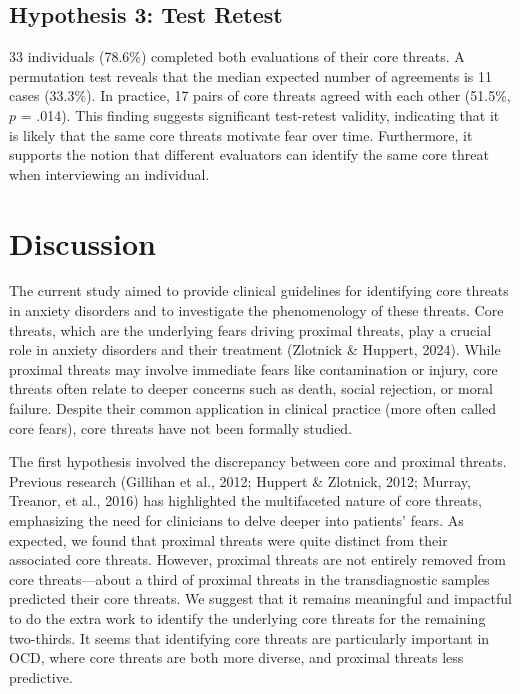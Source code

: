 \documentclass[
  man,floatsintext]{apa7}
\begin{document}
\subsection{Hypothesis 3: Test Retest}\label{hypothesis-3-test-retest}

33 individuals (78.6\%) completed both evaluations of their core threats.
A permutation test reveals that the median expected number of agreements is 11 cases (33.3\%).
In practice, 17 pairs of core threats agreed with each other (51.5\%, \(p\) = .014).
This finding suggests significant test-retest validity, indicating that it is likely that the same core threats motivate fear over time.
Furthermore, it supports the notion that different evaluators can identify the same core threat when interviewing an individual.

\section{Discussion}\label{discussion}

The current study aimed to provide clinical guidelines for identifying core threats in anxiety disorders and to investigate the phenomenology of these threats.
Core threats, which are the underlying fears driving proximal threats, play a crucial role in anxiety disorders and their treatment (Zlotnick \& Huppert, 2024).
While proximal threats may involve immediate fears like contamination or injury, core threats often relate to deeper concerns such as death, social rejection, or moral failure.
Despite their common application in clinical practice (more often called core fears), core threats have not been formally studied.

The first hypothesis involved the discrepancy between core and proximal threats.
Previous research (Gillihan et al., 2012; Huppert \& Zlotnick, 2012; Murray, Treanor, et al., 2016) has highlighted the multifaceted nature of core threats, emphasizing the need for clinicians to delve deeper into patients' fears.
As expected, we found that proximal threats were quite distinct from their associated core threats.
However, proximal threats are not entirely removed from core threats---about a third of proximal threats in the transdiagnostic samples predicted their core threats.
We suggest that it remains meaningful and impactful to do the extra work to identify the underlying core threats for the remaining two-thirds.
It seems that identifying core threats are particularly important in OCD, where core threats are both more diverse, and proximal threats less predictive.
\end{document}
